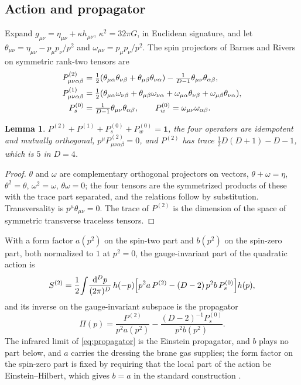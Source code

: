 \documentclass[aps,prd,10pt,twocolumn,superscriptaddress,nofootinbib,floatfix,longbibliography,showpacs,showkeys]{revtex4-2}
\theoremstyle{plain}
\newtheorem{lemma}{Lemma}
\theoremstyle{definition}
\theoremstyle{remark}
\newcommand{\Pt}{P^{(2)}}
\newcommand{\Ps}{P^{(0)}}
\newcommand{\dd}{\mathrm{d}}
\begin{document}
\subsection{Action and propagator}

Expand $g_{\mu\nu}=\eta_{\mu\nu}+\kappa h_{\mu\nu}$, $\kappa^2=32\pi G$, in Euclidean signature, and let $\theta_{\mu\nu}=\eta_{\mu\nu}-p_\mu p_\nu/p^2$ and $\omega_{\mu\nu}=p_\mu p_\nu/p^2$. The spin projectors of Barnes and Rivers \cite{Rivers1964,VanNieuwenhuizen1973} on symmetric rank-two tensors are
\begin{align}
\Pt_{\mu\nu\alpha\beta}&=\tfrac12(\theta_{\mu\alpha}\theta_{\nu\beta}+\theta_{\mu\beta}\theta_{\nu\alpha})-\tfrac1{D-1}\theta_{\mu\nu}\theta_{\alpha\beta},\notag\\
P^{(1)}_{\mu\nu\alpha\beta}&=\tfrac12(\theta_{\mu\alpha}\omega_{\nu\beta}+\theta_{\mu\beta}\omega_{\nu\alpha}+\omega_{\mu\alpha}\theta_{\nu\beta}+\omega_{\mu\beta}\theta_{\nu\alpha}),\label{eq:projectors}\\
\Ps_{s}&=\tfrac1{D-1}\theta_{\mu\nu}\theta_{\alpha\beta},\qquad
\Ps_{w}=\omega_{\mu\nu}\omega_{\alpha\beta}.\notag
\end{align}

\begin{lemma}
\label{lem:projectors}
$\Pt+P^{(1)}+\Ps_s+\Ps_w=\mathbf 1$, the four operators are idempotent and mutually orthogonal, $p^\mu\Pt_{\mu\nu\alpha\beta}=0$, and $\Pt$ has trace $\tfrac12D(D+1)-D-1$, which is $5$ in $D=4$.
\end{lemma}

\begin{proof}
$\theta$ and $\omega$ are complementary orthogonal projectors on vectors, $\theta+\omega=\eta$, $\theta^2=\theta$, $\omega^2=\omega$, $\theta\omega=0$; the four tensors are the symmetrized products of these with the trace part separated, and the relations follow by substitution. Transversality is $p^\mu\theta_{\mu\nu}=0$. The trace of $\Pt$ is the dimension of the space of symmetric transverse traceless tensors.
\end{proof}

With a form factor $a(p^2)$ on the spin-two part and $b(p^2)$ on the spin-zero part, both normalized to $1$ at $p^2=0$, the gauge-invariant part of the quadratic action is
\begin{equation}
\label{eq:quad}
S^{(2)}=\frac12\!\int\!\frac{\dd^Dp}{(2\pi)^D}\,h(-p)\Bigl[p^2a\,\Pt-(D-2)\,p^2b\,\Ps_s\Bigr]h(p),
\end{equation}
and its inverse on the gauge-invariant subspace is the propagator
\begin{equation}
\label{eq:propagator}
\Pi(p)=\frac{\Pt}{p^2a(p^2)}-\frac{(D-2)^{-1}\Ps_s}{p^2b(p^2)} .
\end{equation}
The infrared limit of \eqref{eq:propagator} is the Einstein propagator, and $b$ plays no part below, and $a$ carries the dressing the brane gas supplies; the form factor on the spin-zero part is fixed by requiring that the local part of the action be Einstein--Hilbert, which gives $b=a$ in the standard construction \cite{BGKM2012}.
\end{document}
